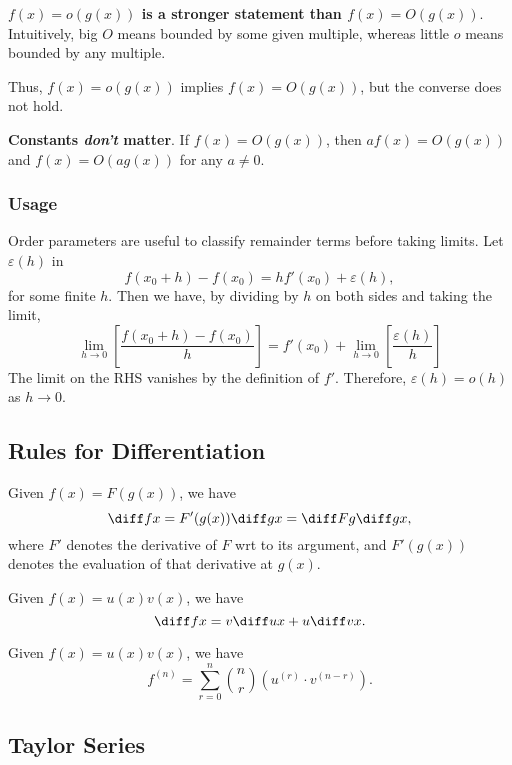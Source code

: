 \documentclass[12pt]{article}
\begin{document}
\textbf{$f(x) = o(g(x))$ is a stronger statement than $f(x) = O(g(x))$}.
Intuitively, big $O$ means bounded by some given multiple,
whereas little $o$ means bounded by any multiple.

Thus, $f(x) = o(g(x))$ implies $f(x) = O(g(x))$,
but the converse does not hold.

\textbf{Constants \emph{don't} matter}. 
If $f(x) = O(g(x))$, then $af(x) = O(g(x))$ and $f(x) = O(ag(x))$
for any $a \ne 0$.

\subsubsection*{Usage}

Order parameters are useful to classify remainder terms before taking limits.
Let $\varepsilon (h)$ in
\[
f(x_{0}+h) - f(x_{0}) = hf'(x_0) + \varepsilon (h),
\]
for some finite $h$. Then we have,
by dividing by $h$ on both sides and taking the limit,
\[
\lim\limits_{h \to 0}\left[\frac{f(x_{0}+h)-f(x_{0})}{h}\right]
= f'(x_{0}) + \lim\limits_{h \to 0}\left[\frac{\varepsilon (h)}{h}\right]
\]
The limit on the RHS vanishes by the definition of $f'$.
Therefore, $\varepsilon (h) = o(h)$ as $h \to 0$.

\newpage
\subsection{Rules for Differentiation}

\begin{theorem}
    Given $f(x) = F(g(x))$, we have
    \[
    \diff f x = F'(g(x)) \diff gx = \diff Fg \diff gx,
    \]
    where $F'$ denotes the derivative of $F$ wrt to its argument,
    and $F'(g(x))$ denotes the evaluation of that derivative at $g(x)$.
\end{theorem}

\begin{theorem}
    Given $f(x) = u(x)v(x)$, we have
    \[
    \diff f x = v \diff ux + u \diff vx.
    \]
\end{theorem}

\begin{theorem}
    Given $f(x) = u(x)v(x)$, we have
    \[
    f^{(n)} = \sum\limits_{r=0}^{n}\binom nr \left(u^{(r)} \cdot v^{(n-r)}\right).
    \]
\end{theorem}

\subsection{Taylor Series}
\end{document}
